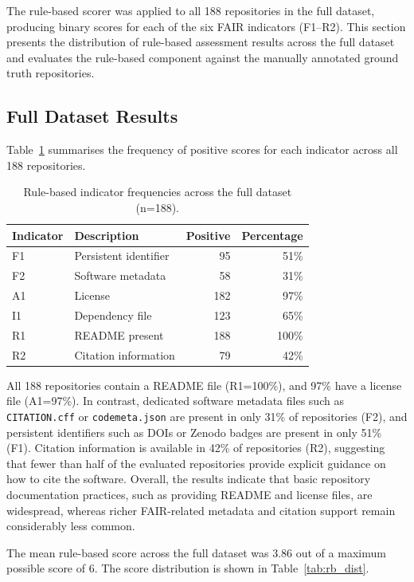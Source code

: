 The rule-based scorer was applied to all 188 repositories in the 
full dataset, producing binary scores for each of the six FAIR 
indicators (F1--R2). This section presents the distribution of 
rule-based assessment results across the full dataset and 
evaluates the rule-based component against the manually annotated 
ground truth repositories.

\subsection{Full Dataset Results}

Table~\ref{tab:rb_full} summarises the frequency of positive scores 
for each indicator across all 188 repositories.

\begin{table}[h]
\centering
\caption{Rule-based indicator frequencies across the full dataset 
(n=188).}
\label{tab:rb_full}
\begin{tabular}{llrr}
\hline
\textbf{Indicator} & \textbf{Description} & \textbf{Positive} & 
\textbf{Percentage} \\
\hline
F1 & Persistent identifier & 95 & 51\% \\
F2 & Software metadata     & 58 & 31\% \\
A1 & License               & 182 & 97\% \\
I1 & Dependency file       & 123 & 65\% \\
R1 & README present        & 188 & 100\% \\
R2 & Citation information  & 79 & 42\% \\
\hline
\end{tabular}
\end{table}

All 188 repositories contain a README file (R1=100\%), and 97\% 
have a license file (A1=97\%). In contrast, dedicated software 
metadata files such as \texttt{CITATION.cff} or 
\texttt{codemeta.json} are present in only 31\% of repositories 
(F2), and persistent identifiers such as DOIs or Zenodo badges 
are present in only 51\% (F1). Citation information is available 
in 42\% of repositories (R2), suggesting that fewer than half of 
the evaluated repositories provide explicit guidance on how to 
cite the software. Overall, the results indicate that basic 
repository documentation practices, such as providing README and 
license files, are widespread, whereas richer FAIR-related metadata 
and citation support remain considerably less common.

The mean rule-based score across the full dataset was 3.86 out of 
a maximum possible score of 6. The score distribution is shown in 
Table~\ref{tab:rb_dist}.

